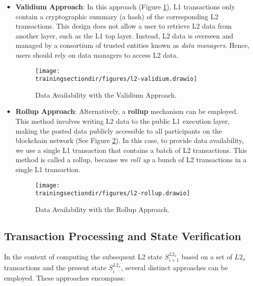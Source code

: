 \begin{itemize}

\item \textbf{Validium Approach}: In this approach (Figure \ref{fig:validium}), L1 transactions only contain a cryptographic summary (a hash) of the corresponding L2 transactions. This design does not allow a user to retrieve L2 data from another layer, such as the L1 top layer. Instead, L2 data is overseen and managed by a consortium of trusted entities known as \textit{data managers}. Hence, users should rely on data managers to access L2 data.

\begin{figure}[h!]
\centering
\texttt{[image: \\trainingsectiondir/figures/l2-validium.drawio]}
\caption{Data Availability with the Validium Approach.}
\label{fig:validium}
\end{figure}



\item \textbf{Rollup Approach}: Alternatively, a \textbf{rollup} mechanism can be employed. This method involves writing L2 data to the public L1 execution layer, making the posted data publicly accessible to all participants on the blockchain network (See Figure \ref{fig:rollup}). In this case, to provide data availability, we use a single L1 transaction that contains a batch of L2 transactions. This method is called a rollup, because we \textit{roll up} a bunch of L2 transactions in a single L1 transaction.

\begin{figure}[h!]
\centering
\texttt{[image: \\trainingsectiondir/figures/l2-rollup.drawio]}
\caption{Data Availability with the Rollup Approach.}
\label{fig:rollup}
\end{figure}

\end{itemize}


\subsection{Transaction Processing and State Verification}

In the context of computing the subsequent L2 state $S^{L2_x}_{i+1}$ based on a set of $L2_x$ transactions and the present state $S^{L2_x}_i$, several distinct approaches can be employed. These approaches encompass:

